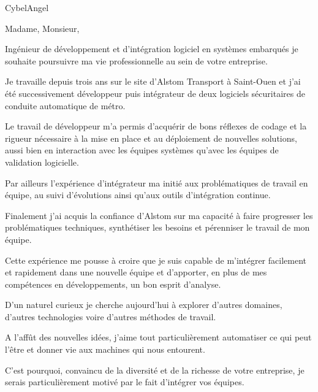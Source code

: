 \documentclass[11pt]{lettre}
\makeatletter
\newcommand*{\NoRule}{\renewcommand*{\rule@length}{0}}
\makeatother
\begin{document}
\begin{letter}{CybelAngel}

  \def\concname{Objet :~}


  \signature{Hoel IRIS}
  \address{Hoel IRIS\\
  54 avenue Mathurin Moreau\\
  75019 Paris\\
  Tel : 06 18 39 30 11\\
  E-Mail : hoel.iris@gmail.com}
  \NoRule
  \notelephone
  \nofax
    \opening{Madame, Monsieur,}


    Ingénieur de développement et d'intégration logiciel en systèmes embarqués je souhaite poursuivre ma vie professionnelle au sein de votre entreprise.

    Je travaille depuis trois ans sur le site d'Alstom Transport à Saint-Ouen et j'ai été successivement développeur puis intégrateur de deux logiciels sécuritaires de conduite automatique de métro.

    Le travail de développeur m'a permis d'acquérir de bons réflexes de codage et la rigueur nécessaire à la mise en place et au déploiement de nouvelles solutions, aussi bien en interaction avec les équipes systèmes qu'avec les équipes de validation logicielle.

    Par ailleurs l'expérience d'intégrateur ma initié aux problématiques de travail en équipe, au suivi d'évolutions ainsi qu'aux outils d'intégration continue.

    Finalement j'ai acquis la confiance d'Alstom sur ma capacité à faire progresser les problématiques techniques, synthétiser les besoins et pérenniser le travail de mon équipe.

    Cette expérience me pousse à croire que je suis capable de m'intégrer facilement et rapidement dans une nouvelle équipe et d'apporter, en plus de mes compétences en développements, un bon esprit d'analyse.

    D'un naturel curieux je cherche aujourd'hui à explorer d'autres domaines, d'autres technologies voire d'autres méthodes de travail.

    A l'affût des nouvelles idées, j'aime tout particulièrement automatiser ce qui peut l'être et donner vie aux machines qui nous entourent.
    
    C'est pourquoi, convaincu de la diversité et de la richesse de votre entreprise, je serais particulièrement motivé par le fait d’intégrer vos équipes.
    

\end{letter}
\end{document}
